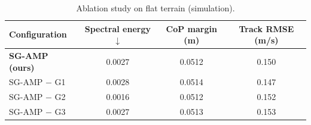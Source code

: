 \begin{table}[t]
  \centering
  \caption{Ablation study on flat terrain (simulation).}
  \label{tab:ablation}
  \begin{tabular}{lccc}
    \toprule
    Configuration & Spectral energy $\downarrow$ & CoP margin (m) & Track RMSE (m/s) \\
    \midrule
    \textbf{SG-AMP (ours)} & 0.0027 & 0.0512 & 0.150 \\
    SG-AMP $-$ G1 & 0.0028 & 0.0514 & 0.147 \\
    SG-AMP $-$ G2 & 0.0016 & 0.0512 & 0.152 \\
    SG-AMP $-$ G3 & 0.0027 & 0.0513 & 0.153 \\
    \bottomrule
  \end{tabular}
\end{table}
